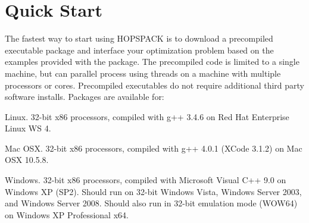 \clearpage
\section{Quick Start}
\label{sec:quickstart}

The fastest way to start using HOPSPACK is to download a precompiled
executable package and interface your optimization problem based on the
examples provided with the package.
The precompiled code is limited to a single machine, but can parallel process
using threads on a machine with multiple processors or cores.
Precompiled executables do not require additional third party software installs.
Packages are available for:
\begin{INDENTdescription}
  \item[Linux.]   32-bit x86 processors, compiled with g++ 3.4.6
                  on Red Hat Enterprise Linux WS 4.
  \item[Mac OSX.] 32-bit x86 processors, compiled with g++ 4.0.1 (XCode 3.1.2)
                  on Mac OSX 10.5.8.
  \item[Windows.] 32-bit x86 processors, compiled with
                  Microsoft Visual C++ 9.0 on Windows XP (SP2).
                  Should run on 32-bit Windows Vista, Windows Server 2003,
                  and Windows Server 2008.
                  Should also run in 32-bit emulation mode (WOW64) on Windows
                  XP Professional x64.
\end{INDENTdescription}

